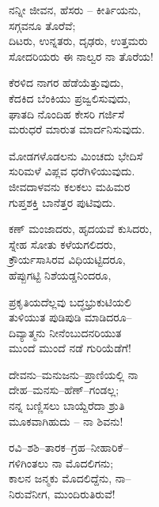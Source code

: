 \begin{myquote}
ನನ್ನೀ ಜೀವನ, ಹೆಸರು – ಕೀರ್ತಿಯನು,\\ಸಗ್ಗವನೂ ತೊರೆವೆ;\\ದಿಟರು, ಉನ್ನತರು, ದೃಢರು, ಉತ್ತಮರು\\ಸೋದರಿಯರು ಈ ನಾಲ್ವರ ನಾ ತೊರೆಯ!
\end{myquote}

\begin{myquote}
ಕೆರಳಿದ ನಾಗರ ಹೆಡೆಯೆತ್ತುವುದು,\\ಕೆದಕಿದ ಬೆಂಕಿಯು ಪ್ರಜ್ವಲಿಸುವುದು,\\ಘಾತದಿ ನೊಂದಿಹ ಕೇಸರಿ ಗರ್ಜಿಸೆ\\ಮರುಧರೆ ಮಾರುತ ಮಾರ್ದನಿಸುವುದು.
\end{myquote}

\begin{myquote}
ಮೋಡಗಳೊಡಲನು ಮಿಂಚದು ಭೇದಿಸೆ\\ಸುರಿಮಳೆ ವಿಪ್ಲವ ಧರೆಗಿಳಿಯುವುದು.\\ಜೀವದಾಳವನು ಕಲಕಲು ಮಹಿಮರ\\ಗುಪ್ತಶಕ್ತಿ ಬಾನೆತ್ತರ ಪುಟಿವುದು.
\end{myquote}

\begin{myquote}
ಕಣ್ ಮಂಜಾದರು, ಹೃದಯವೆ ಕುಸಿದರು,\\ಸ್ನೇಹ ಸೋತು ಕಳೆಯಗಲಿದರು,\\ಕ್ರೌರ್ಯಸಾಸಿರವ ವಿಧಿಯಟ್ಟಿದರೂ,\\ಹೆಪ್ಪುಗಟ್ಟಿ ನಿಶೆಯಡ್ಡನಿಂದರೂ,
\end{myquote}

\begin{myquote}
ಪ್ರಕೃತಿಯದೆಲ್ಲವು ಬದ್ಧಭ್ರುಕುಟಿಯಲಿ\\ತುಳಿಯುತ ಪುಡಿಪುಡಿ ಮಾಡಿದರೂ–\\ದಿವ್ಯಾತ್ಮನು ನೀನೆಂಬುದನರಿಯುತ\\ಮುಂದೆ ಮುಂದೆ ನಡೆ ಗುರಿಯೆಡೆಗೆ!
\end{myquote}

\begin{myquote}
ದೇವನು–ಮನುಜನು–ಪ್ರಾಣಿಯಲ್ಲಿ ನಾ\\ದೇಹ–ಮನಸು–ಹೆಣ್–ಗಂಡಲ್ಲ;\\ನನ್ನ ಬಣ್ಣಿಸಲು ಬಾಯ್ದೆರೆದಾ ಶ್ರುತಿ\\ಮೂಕವಾಗಿಹುದು – ನಾ ಶಿವನು!
\end{myquote}

\begin{myquote}
ರವಿ–ಶಶಿ–ತಾರಕ–ಗ್ರಹ–ನೀಹಾರಿಕೆ–\\ಗಳಿಗಿಂತಲು ನಾ ಮೊದಲಿಗನು;\\ಕಾಲನ ಜನ್ಮಕು ಮೊದಲಿದ್ದೆನು, ನಾ–\\ನಿರುವೆನೀಗ, ಮುಂದಿರುತಿರುವೆ!
\end{myquote}

